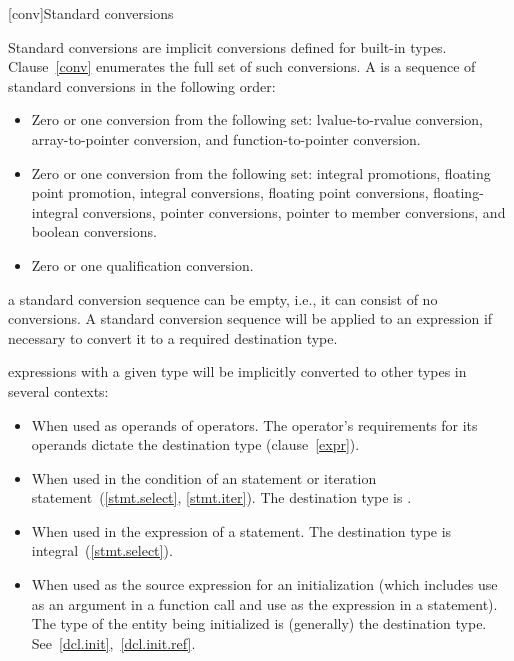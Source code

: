 [conv]{Standard conversions}

%

\pnum
{}%
%
Standard conversions are implicit conversions defined for built-in types.
Clause~\ref{conv} enumerates the full set of such conversions. A
%
 is a sequence of standard
conversions in the following order:

\begin{itemize}
\item Zero or one conversion from the following set: lvalue-to-rvalue
conversion, array-to-pointer conversion, and function-to-pointer
conversion.

\item Zero or one conversion from the following set: integral
promotions, floating point promotion, integral conversions, floating
point conversions, floating-integral conversions, pointer conversions,
pointer to member conversions, and boolean conversions.

\item Zero or one qualification conversion.
\end{itemize}

\enternote
a standard conversion sequence can be empty, i.e., it can consist of no
conversions. \exitnote A standard conversion sequence will be applied to
an expression if necessary to convert it to a required destination type.

\pnum
\enternote 
expressions with a given type will be implicitly converted to other
types in several contexts:

\begin{itemize}
\item When used as operands of operators. The operator's requirements
for its operands dictate the destination type (clause~\ref{expr}).

\item When used in the condition of an  statement or iteration
statement~(\ref{stmt.select}, \ref{stmt.iter}). The destination type is
.

\item When used in the expression of a  statement. The
destination type is integral~(\ref{stmt.select}).

\item When used as the source expression for an initialization (which
includes use as an argument in a function call and use as the expression
in a  statement). The type of the entity being initialized
is (generally) the destination type.
See~\ref{dcl.init},~\ref{dcl.init.ref}.
\end{itemize}
\exitnoteb

